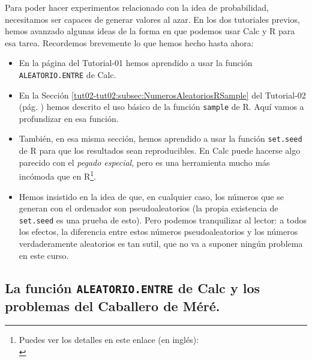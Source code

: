 \documentclass[10pt,a4paper]{article}\usepackage[]{graphicx}\usepackage[]{color}
\begin{document}
Para poder hacer experimentos relacionado con la idea de probabilidad, necesitamos ser capaces de generar valores al azar. En los dos tutoriales previos, hemos avanzado algunas ideas de la forma en que podemos usar Calc y R para esa tarea. Recordemos brevemente lo que hemos hecho hasta ahora:

\begin{itemize}
  \item En la página \pageref{tut01-tut01:subsubsec:NumerosAleatoriosCalc} del Tutorial-01 hemos aprendido a usar la función {\tt ALEATORIO.ENTRE} de Calc.
  \item En la Sección \ref{tut02-tut02:subsec:NumerosAleatoriosRSample} del Tutorial-02 (pág. \pageref{tut02-tut02:subsec:NumerosAleatoriosRSample}) hemos descrito el uso básico de la función {\tt sample} de R. Aquí vamos a profundizar en esa función.
  \item También, en esa misma sección, hemos aprendido a usar la función {\tt set.seed} de R para que los resultados sean reproducibles. En Calc puede hacerse algo parecido con el {\em pegado especial}, pero es una herramienta mucho más incómoda que en R\footnote{Puedes ver los detalles en este enlace (en inglés):\\ }.
  \item Hemos insistido en la idea de que, en cualquier caso, los números que se generan con el ordenador son pseudoaleatorios (la propia existencia de {\tt set.seed} es una prueba de esto). Pero podemos tranquilizar al lector: a todos los efectos, la diferencia entre estos números pseudoaleatorios y los números verdaderamente aleatorios es tan sutil, que no va a suponer ningún problema en este curso.
\end{itemize}

\subsection{La función {\tt ALEATORIO.ENTRE} de Calc y los problemas del Caballero de Méré.}
\end{document}
